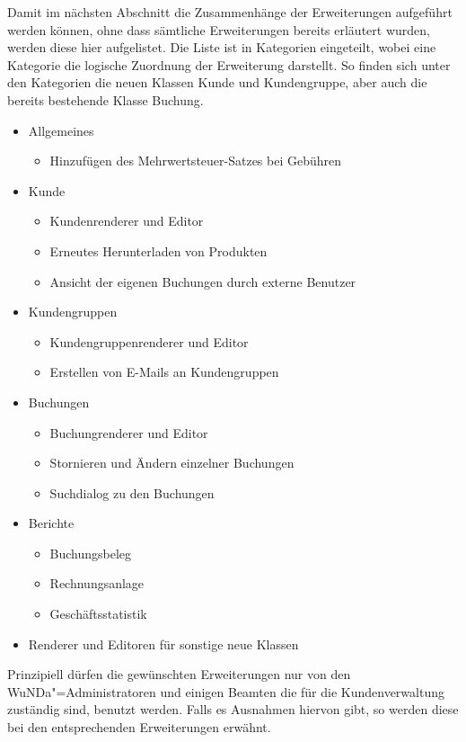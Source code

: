 Damit im nächsten Abschnitt die Zusammenhänge der Erweiterungen aufgeführt werden können, ohne dass sämtliche Erweiterungen bereits erläutert wurden, werden diese hier aufgelistet.
Die Liste ist in Kategorien eingeteilt, wobei eine Kategorie die logische Zuordnung der Erweiterung darstellt. So finden sich unter den Kategorien die neuen Klassen Kunde und Kundengruppe, aber auch die bereits bestehende Klasse Buchung. 
\begin{itemize}
	\item Allgemeines
	\begin{itemize}
		\item Hinzufügen des Mehrwertsteuer-Satzes bei Gebühren
	\end{itemize}
	\item Kunde
	\begin{itemize}
		\item Kundenrenderer und Editor
		\item Erneutes Herunterladen von Produkten
		\item Ansicht der eigenen Buchungen durch externe Benutzer
	\end{itemize}
	\item Kundengruppen
	\begin{itemize}
		\item Kundengruppenrenderer und Editor
		\item Erstellen von E-Mails an Kundengruppen
	\end{itemize}
	\item Buchungen
	\begin{itemize}
		\item Buchungrenderer und Editor
		\item Stornieren und Ändern einzelner Buchungen
		\item Suchdialog zu den Buchungen
	\end{itemize}
	\item Berichte
	\begin{itemize}
		\item Buchungsbeleg
		\item Rechnungsanlage
		\item Geschäftsstatistik
	\end{itemize}	 
	\item Renderer und Editoren für sonstige neue Klassen
\end{itemize}

Prinzipiell dürfen die gewünschten Erweiterungen nur von den \ac{WuNDa}"=Administratoren und einigen Beamten die für die Kundenverwaltung zuständig sind, benutzt werden. Falls es  Ausnahmen hiervon gibt, so werden diese bei den entsprechenden Erweiterungen erwähnt.

